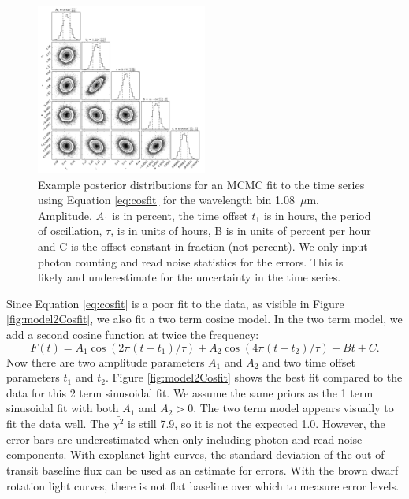 \documentclass[twocolumn]{aastex6}
\begin{document}
\begin{figure}
\begin{centering}
\includegraphics[width=0.5\textwidth]{corner_example.pdf}
\caption{Example posterior distributions for an MCMC fit to the time series using Equation \ref{eq:cosfit} for the wavelength bin 1.08~$\mu$m.
Amplitude, $A_1$ is in percent, the time offset $t_1$ is in hours, the period of oscillation, $\tau$, is in units of hours, B is in units of percent per hour and C is the offset constant in fraction (not percent).
We only input photon counting and read noise statistics for the errors.
This is likely and underestimate for the uncertainty in the time series.
}\label{fig:postCosfit}
\end{centering}
\end{figure}

Since Equation \ref{eq:cosfit} is a poor fit to the data, as visible in Figure \ref{fig:model2Cosfit}, we also fit a two term cosine model.
In the two term model, we add a second cosine function at twice the frequency:
\begin{equation}\label{eq:cosfit2term}
F(t) = A_1 \cos(2 \pi (t - t_1)/\tau) + A_2 \cos(4 \pi (t - t_2)/\tau) +  B t + C.
\end{equation}
Now there are two amplitude parameters $A_1$ and $A_2$ and two time offset parameters $t_1$ and $t_2$.
Figure \ref{fig:model2Cosfit} shows the best fit compared to the data for this 2 term sinusoidal fit.
We assume the same priors as the 1 term sinusoidal fit with both $A_1$ and $A_2 > 0$.
The two term model appears visually to fit the data well.
The $\bar{\chi^2}$ is still 7.9, so it is not the expected 1.0.
However, the error bars are underestimated when only including photon and read noise components.
With exoplanet light curves, the standard deviation of the out-of-transit baseline flux can be used as an estimate for errors. With the brown dwarf rotation light curves, there is not flat baseline over which to measure error levels.
\end{document}
